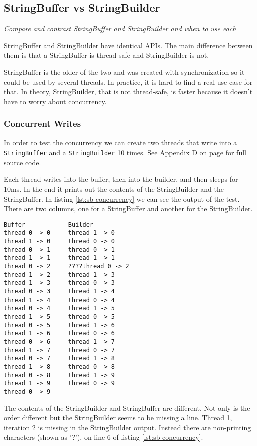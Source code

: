 \subsection{StringBuffer vs StringBuilder}
\textit{Compare and contrast StringBuffer and StringBuilder and when to use each}

StringBuffer and StringBuilder have identical APIs. The main difference between them is that a StringBuffer is thread-safe and StringBuilder is not.

StringBuffer is the older of the two and was created with synchronization so it could be used by several threads. In practice, it is hard to find a real use case for that. In theory, StringBuilder, that is not thread-safe, is faster because it doesn't have to worry about concurrency.

\subsubsection{Concurrent Writes}
In order to test the concurrency  we can create two threads that write into a \texttt{StringBuffer} and a \texttt{StringBuilder} 10 times. See Appendix D on page \pageref{App:AppendixD} for full source code.

Each thread writes into the buffer, then into the builder, and then sleeps for 10ms. In the end it prints out the contents of the StringBuilder and the StringBuffer. In listing \ref{lst:sb-concurrency} we can see the output of the test. There are two columns, one for a StringBuffer and another for the StringBuilder.  
\begin{lstlisting}[caption=StringBuffer and StringBuilder Concurrency Test, label=lst:sb-concurrency]
Buffer	          Builder
thread 0 -> 0     thread 1 -> 0
thread 1 -> 0     thread 0 -> 0
thread 0 -> 1     thread 0 -> 1
thread 1 -> 1     thread 1 -> 1
thread 0 -> 2     ????thread 0 -> 2
thread 1 -> 2     thread 1 -> 3
thread 1 -> 3     thread 0 -> 3
thread 0 -> 3     thread 1 -> 4
thread 1 -> 4     thread 0 -> 4
thread 0 -> 4     thread 1 -> 5
thread 1 -> 5     thread 0 -> 5
thread 0 -> 5     thread 1 -> 6
thread 1 -> 6     thread 0 -> 6
thread 0 -> 6     thread 1 -> 7
thread 1 -> 7     thread 0 -> 7
thread 0 -> 7     thread 1 -> 8
thread 1 -> 8     thread 0 -> 8
thread 0 -> 8     thread 1 -> 9
thread 1 -> 9     thread 0 -> 9
thread 0 -> 9     
\end{lstlisting}
\vspace{2em}

The contents of the StringBuilder and StringBuffer are different. Not only is the order different but the StringBuilder seems to be missing a line. Thread 1, iteration 2 is missing in the StringBuilder output. Instead there are non-printing characters (shown as '?'), on line 6 of listing \ref{lst:sb-concurrency}.

